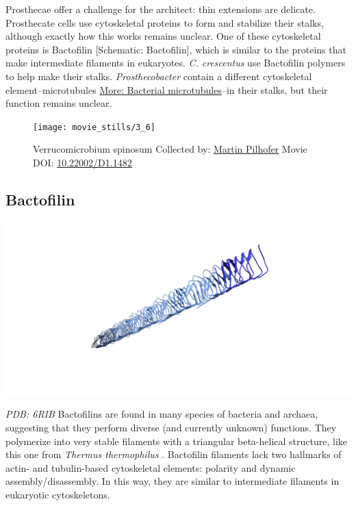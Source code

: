 \documentclass[]{tufte-book}
\begin{document}
Prosthecae offer a challenge for the architect: thin extensions are
delicate. Prosthecate cells use cytoskeletal proteins to form and
stabilize their stalks, although exactly how this works remains unclear.
One of these cytoskeletal proteins is Bactofilin {[}Schematic:
Bactofilin{]}, which is similar to the proteins that make intermediate
filaments in eukaryotes. \emph{C. crescentus} use Bactofilin polymers to
help make their stalks. \emph{Prosthecobacter} contain a different
cytoskeletal element--microtubules
\protect\hyperlink{Bacterial_microtubules}{More: Bacterial
microtubules}--in their stalks, but their function remains unclear.





\begin{figure}
\texttt{[image: movie\_stills/3\_6]} \caption[Verrucomicrobium spinosum Collected by:
\protect\hyperlink{martin_pilhofer}{Martin Pilhofer} Movie DOI:
\href{https://doi.org/10.22002/D1.1482}{10.22002/D1.1482}]{Verrucomicrobium spinosum Collected by:
\protect\hyperlink{martin_pilhofer}{Martin Pilhofer} Movie DOI:
\href{https://doi.org/10.22002/D1.1482}{10.22002/D1.1482}}\label{fig:3-6}
\end{figure}

\subsection{Bactofilin}\label{Bactofilin}

\includegraphics{img/schematics/3_6_1}

\emph{PDB: 6RIB} Bactofilins are found in many species of bacteria and
archaea, suggesting that they perform diverse (and currently unknown)
functions. They polymerize into very stable filaments with a triangular
beta-helical structure, like this one from \emph{Thermus thermophilus}
\citep{deng2019}. Bactofilin filaments lack two hallmarks of actin- and
tubulin-based cytoskeletal elements: polarity and dynamic
assembly/disassembly. In this way, they are similar to intermediate
filaments in eukaryotic cytoskeletons.
\end{document}
